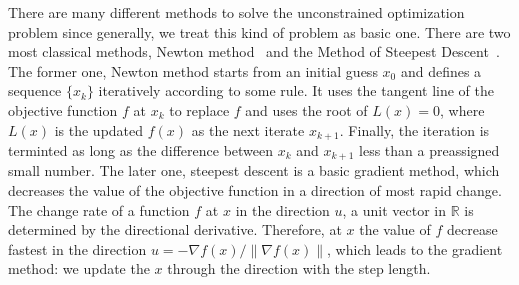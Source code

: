 \par There are many different methods to solve the unconstrained optimization problem since generally, we treat this kind of problem as basic one. There are two most classical methods, Newton method~\citep{NT:36} and the Method of Steepest Descent~\citep{DP:09}. The former one, Newton method starts from an initial guess $x_0$ and defines a sequence $\{x_k\}$
iteratively according to some rule. It uses the tangent line of the objective function $f$ at $x_k$ to replace $f$ and uses the root of $L(x) = 0$, where $L(x)$ is the updated $f(x)$ as the next iterate $x_{k+1}$. Finally, the iteration is terminted as long as the difference between $x_k$ and $x_{k+1}$ less than a preassigned small number. The later one, steepest descent is a basic gradient method, which decreases the value of the objective function in a direction of most rapid change. The change rate of a function $f$ at $x$ in the direction $u$, a unit vector in $\mathbb{R}$ is determined by the directional derivative. Therefore, at $x$ the value of $f$ decrease fastest in the direction $u=-\nabla f(x)/\|\nabla f(x)\|$, which leads to the gradient method: we update the $x$ through the direction with the step length. 


